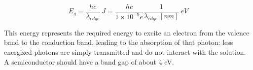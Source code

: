 \begin{equation}
   E_g = \frac{hc}{\lambda_{edge}}~J = \frac{hc}{1\times10^{-9} e} \frac{1}{\lambda_{edge}~[nm]} ~eV
\end{equation}

This energy represents the required energy to excite an electron from the valence band to the conduction band, leading to the absorption of that photon: less energized photons are simply transmitted and do not interact with the solution. A semiconductor should have a band gap of about 4 eV.